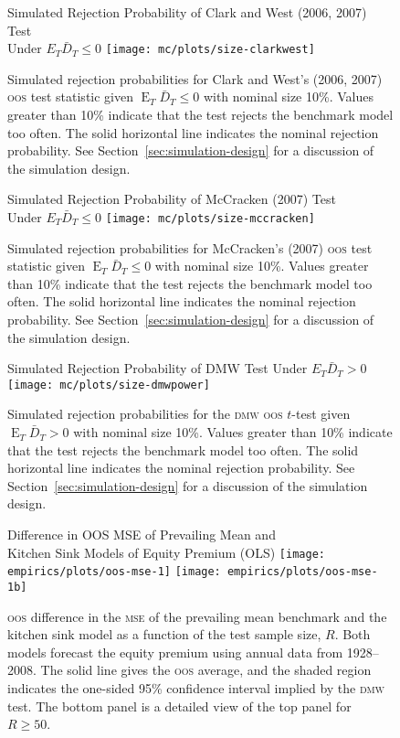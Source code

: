 \documentclass[11pt]{article}
\DeclareMathOperator{\E}{E}
\newcommand{\oosB}{\bar{D}_{T}}
\begin{document}
\begin{figure}
  \centering
  \large{Simulated Rejection Probability of Clark and West
      (2006, 2007) Test \\ Under $E_T \oosB \leq 0$}
  \texttt{[image: mc/plots/size-clarkwest]}
  \caption{Simulated rejection probabilities for Clark and West's
    (2006, 2007) \protect\textsc{oos} test statistic given $\E_T \oosB
    \leq 0$ with nominal size 10\%.  Values greater than 10\% indicate
    that the test rejects the benchmark model too often.  The solid
    horizontal line indicates the nominal rejection probability.  See
    Section~\ref{sec:simulation-design} for a discussion of the
    simulation design.}
   \label{fig:clarkwest}
\end{figure}

\begin{figure}
  \centering
  \large{Simulated Rejection Probability of McCracken (2007)
      Test \\ Under $E_T \oosB \leq 0$}
  \texttt{[image: mc/plots/size-mccracken]}
  \caption{Simulated rejection probabilities for McCracken's (2007)
    \protect \textsc{oos} test statistic given $\E_T \oosB \leq 0$ with
    nominal size 10\%.  Values greater than 10\% indicate that the
    test rejects the benchmark model too often.  The solid horizontal
    line indicates the nominal rejection probability.  See
    Section~\ref{sec:simulation-design} for a discussion of the
    simulation design.}
  \label{fig:mccracken}
\end{figure}

\begin{figure}
  \centering
  \large{Simulated Rejection Probability of DMW Test Under $E_T
      \oosB > 0$}
  \texttt{[image: mc/plots/size-dmwpower]}
  \caption{Simulated rejection probabilities for the \protect \textsc{dmw}
    \protect\textsc{oos} $t$-test given $\E_T \oosB > 0$ with nominal
    size 10\%.  Values greater than 10\% indicate that the test
    rejects the benchmark model too often.  The solid horizontal line
    indicates the nominal rejection probability.  See
    Section~\ref{sec:simulation-design} for a discussion of the
    simulation design.}
  \label{fig:ttest-power}
\end{figure}

\begin{figure}
\centering
\large{Difference in OOS MSE of Prevailing Mean and\\ Kitchen
    Sink Models of Equity Premium (OLS)}
\texttt{[image: empirics/plots/oos-mse-1]}
\texttt{[image: empirics/plots/oos-mse-1b]}
\caption{\protect \textsc{oos} difference in the \protect\textsc{mse}
  of the prevailing mean benchmark and the kitchen sink model as a
  function of the test sample size, $R$.  Both models forecast the
  equity premium using annual data from 1928--2008.  The solid line
  gives the \protect \textsc{oos} average, and the shaded region indicates the
  one-sided 95\% confidence interval implied by the \protect
  \textsc{dmw} test.  The bottom panel is a detailed view of the top
  panel for $R \geq 50$.}
\label{fig:empirics1}
\end{figure}
\end{document}
